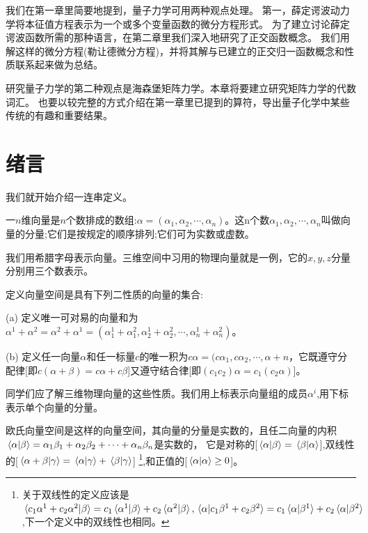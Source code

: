 我们在第一章里简要地提到，量子力学可用两种观点处理。
第一，薛定谔波动力学将本征值方程表示为一个或多个变量函数的微分方程形式。
为了建立讨论薛定谔波函数所需的那种语言，在第二章里我们深入地研究了正交函数概念。
我们用解这样的微分方程(勒让德微分方程)，并将其解与已建立的正交归一函数概念和性质联系起来做为总结。

研究量子力学的第二种观点是海森堡矩阵力学。本章将要建立研究矩阵力学的代数词汇。
也要以较完整的方式介绍在第一章里已提到的算符，导出量子化学中某些传统的有趣和重要结果。

\section{绪言}
我们就开始介绍一连串定义。
\begin{definition}[n维向量]
    一$n$维向量是$n$个数排成的数组:$\alpha=(\alpha_1,\alpha_2, \cdots ,\alpha_n)$。这n个数$\alpha_1,\alpha_2, \cdots ,\alpha_n$叫做向量的分量;它们是按规定的顺序排列;它们可为实数或虚数。
 \end{definition}

我们用希腊字母表示向量。三维空间中习用的物理向量就是一例，它的$x,y,z$分量分别用三个数表示。
\begin{definition}[向量空间]
    定义向量空间是具有下列二性质的向量的集合:
    
    (a) 定义唯一可对易的向量和为$\alpha^1+\alpha^2=\alpha^2+\alpha^1=(\alpha^1_1+\alpha^2_1,\alpha^1_2+\alpha^2_2,\cdots,\alpha^1_n+\alpha^2_n)$。
    
    (b) 定义任一向量$\alpha$和任一标量$c$的唯一积为$c\alpha=(c\alpha_1,c\alpha_2,\cdots,\alpha+n$，它既遵守分配律[即$c(\alpha+\beta)=c\alpha+c\beta$]又遵守结合律[即$(c_1c_2)\alpha=c_1(c_2\alpha)$]。    
\end{definition}

同学们应了解三维物理向量的这些性质。我们用上标表示向量组的成员${\alpha^i}$,用下标表示单个向量的分量。
\begin{definition}[欧氏向量空间]
    欧氏向量空间是这样的向量空间，其向量的分量是实数的，且任二向量的内积$\bra*{\alpha}\ket*{\beta}=\alpha_1\beta_1+\alpha_2\beta_2+\cdots+\alpha_n\beta_n$是实数的，
    它是对称的[$\bra*{\alpha}\ket*{\beta}=\bra*{\beta}\ket*{\alpha}$],双线性的[$\bra*{\alpha+\beta}\ket*{\gamma}=\bra*{\alpha}\ket*{\gamma}+\bra*{\beta}\ket*{\gamma}$]
    \footnote{关于双线性的定义应该是$\bra*{c_1\alpha^1+c_2\alpha^2}\ket*{\beta}=c_1\bra*{\alpha^1}\ket*{\beta}+c_2\bra*{\alpha^2}\ket*{\beta},\bra*{\alpha}\ket*{c_1\beta^1+c_2\beta^2}=c_1\bra*{\alpha}\ket*{\beta^1}+c_2\bra*{\alpha}\ket*{\beta^2}$,下一个定义中的双线性也相同。},和正值的[$\bra*{\alpha}\ket*{\alpha} \geq 0$]。
\end{definition}

